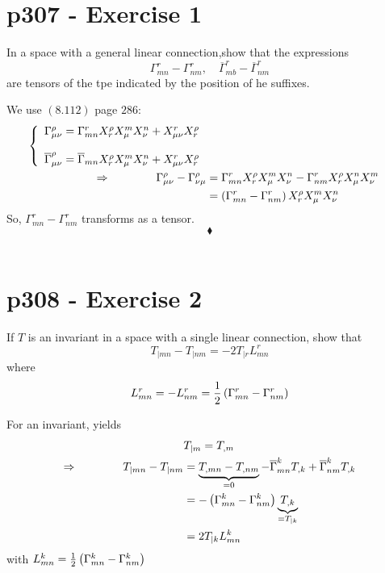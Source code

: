\section{p307 - Exercise 1}
\begin{tcolorbox}
In a space with a general linear connection,show that the expressions
$$\Gamma^r_{mn}- \Gamma^r_{nm}, \quad \overline{\Gamma}^r_{mb}- \overline{\Gamma}^r_{nm}$$ are tensors of the tpe indicated by the position of he suffixes.
\end{tcolorbox}
 We use $\mathbf{(8.112)}$ page $286$:
 \begin{align}
 \left\{\begin{array}{l}
 \Gamma^{\rho}_{\mu\nu} = \Gamma^{r}_{mn} X^{\rho}_r X^m_{\mu} X^n_{\nu} + X^r_{\mu \nu} X^{\rho}_r\\\\
 \overline{\Gamma}^{\rho}_{\mu\nu} = \overline{\Gamma}_{mn} X^{\rho}_r X^m_{\mu} X^n_{\nu} + X^r_{\mu \nu} X^{\rho}_r\\
 \end{array}\right.\\
 \Rightarrow\quad\quad\quad\quad \Gamma^{\rho}_{\mu\nu} -\Gamma^{\rho}_{\nu\mu}&=\Gamma^{r}_{mn} X^{\rho}_r X^m_{\mu} X^n_{\nu}-\Gamma^{r}_{nm} X^{\rho}_r X^n_{\mu} X^m_{\nu}\\
 &= \left(\Gamma^{r}_{mn}-\Gamma^{r}_{nm}\right)X^{\rho}_r X^m_{\mu} X^n_{\nu}
 \end{align}
 So, $\Gamma^{r}_{mn}-\Gamma^{r}_{nm}$ transforms as a tensor.
$$\blacklozenge$$\\
\newpage

\section{p308 - Exercise 2}
\begin{tcolorbox}
 If $T$ is an invariant in a space with a single linear connection, show that
 $$ T_{|mn} - T_{|nm} = -2 T_{|r} L^r_{mn}$$
 where 
 $$ L^r_{mn} = -L^r_{nm} = \frac{1}{2}\left(\Gamma^r_{mn} - \Gamma^r_{nm}\right)$$
\end{tcolorbox}
For an invariant, yields
\begin{align}
&T_{|m} = T_{,m}\\
\Rightarrow\quad\quad\quad\quad T_{|mn}-T_{|nm} &= \underbrace{T_{,mn}-T_{,nm}}_{=0} -\overline{\Gamma}^k_{mn}T_{,k} + \overline{\Gamma}^k_{nm}T_{,k} \\
&= -\left(\Gamma^k_{mn}- \Gamma^k_{nm} \right) \underbrace{T_{,k}}_{= T_{|k}}\\
&= 2T_{|k}L^k_{mn}
\end{align}
with $ L^k_{mn} = \frac{1}{2}\left(\Gamma^k_{mn}- \Gamma^k_{nm} \right) $

